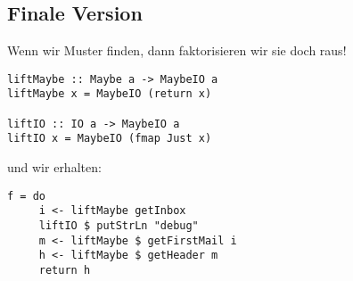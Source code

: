 \documentclass{beamer}
\begin{document}
\subsection{Finale Version}

\begin{frame}[fragile]
Wenn wir Muster finden, dann faktorisieren wir sie doch raus!
\begin{verbatim}
liftMaybe :: Maybe a -> MaybeIO a
liftMaybe x = MaybeIO (return x)

liftIO :: IO a -> MaybeIO a
liftIO x = MaybeIO (fmap Just x)
\end{verbatim}
\pause
und wir erhalten:
\begin{verbatim}
f = do
     i <- liftMaybe getInbox
     liftIO $ putStrLn "debug"
     m <- liftMaybe $ getFirstMail i
     h <- liftMaybe $ getHeader m
     return h
\end{verbatim}

\end{frame}
\end{document}
